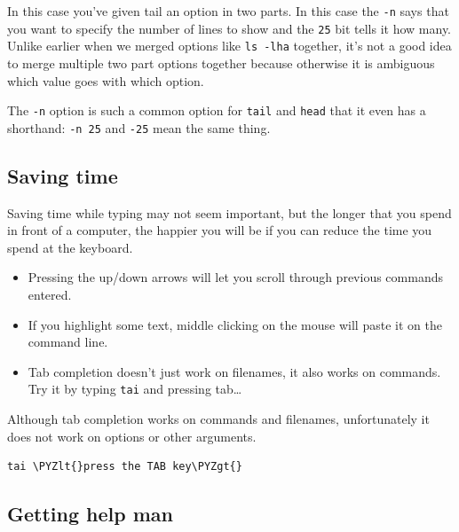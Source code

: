\documentclass[11pt]{article}
\makeatletter
\def\PYZlt{\char`\<}
\def\PYZgt{\char`\>}
\newcommand{\boxspacing}{\kern\kvtcb@left@rule\kern\kvtcb@boxsep}
\newcommand{\prompt}[4]{
       \ttfamily\llap{{\color{#2}\LARGE\faKeyboardO\hspace{3pt}#4}}\vspace{-\baselineskip}
    }
\makeatother
\begin{document}
    In this case you've given tail an option in two parts. In this case the
\texttt{-n} says that you want to specify the number of lines to show
and the \texttt{25} bit tells it how many. Unlike earlier when we merged
options like \texttt{ls\ -lha} together, it's not a good idea to merge
multiple two part options together because otherwise it is ambiguous
which value goes with which option.

The \texttt{-n} option is such a common option for \texttt{tail} and
\texttt{head} that it even has a shorthand: \texttt{-n\ 25} and
\texttt{-25} mean the same thing.

    \hypertarget{saving-time}{%
\subsection{Saving time}\label{saving-time}}

Saving time while typing may not seem important, but the longer that you
spend in front of a computer, the happier you will be if you can reduce
the time you spend at the keyboard.

\begin{itemize}
\item
  Pressing the up/down arrows will let you scroll through previous
  commands entered.
\item
  If you highlight some text, middle clicking on the mouse will paste it
  on the command line.
\item
  Tab completion doesn't just work on filenames, it also works on
  commands. Try it by typing \texttt{tai} and pressing tab\ldots{}
\end{itemize}

Although tab completion works on commands and filenames, unfortunately
it does not work on options or other arguments.

    \begin{tcolorbox}[breakable, size=fbox, boxrule=1pt, pad at break*=1mm,colback=cellbackground, colframe=cellborder]
\prompt{In}{incolor}{ }{\boxspacing}
\begin{Verbatim}[commandchars=\\\{\}]
tai \PYZlt{}press the TAB key\PYZgt{}
\end{Verbatim}
\end{tcolorbox}

    \hypertarget{getting-help-man}{%
\subsection{Getting help man}\label{getting-help-man}}
\end{document}
